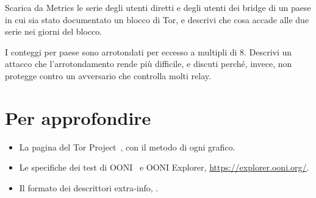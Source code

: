 \begin{esercizio}[2]\label{es:24-censura}
Scarica da Metrics le serie degli utenti diretti e degli utenti dei bridge di un paese in cui sia stato documentato un blocco di Tor, e descrivi che cosa accade alle due serie nei giorni del blocco.
\end{esercizio}

\begin{esercizio}[3]\label{es:24-privacy}
I conteggi per paese sono arrotondati per eccesso a multipli di 8. Descrivi un attacco che l'arrotondamento rende più difficile, e discuti perché, invece, non protegge contro un avversario che controlla molti relay.
\end{esercizio}

\section*{Per approfondire}
\begin{itemize}
  \item La pagina  del Tor Project~\cite{metricsreproducible}, con il metodo di ogni grafico.
  \item Le specifiche dei test di OONI~\cite{oonitor} e OONI Explorer, \url{https://explorer.ooni.org/}.
  \item Il formato dei descrittori extra-info, .
\end{itemize}
